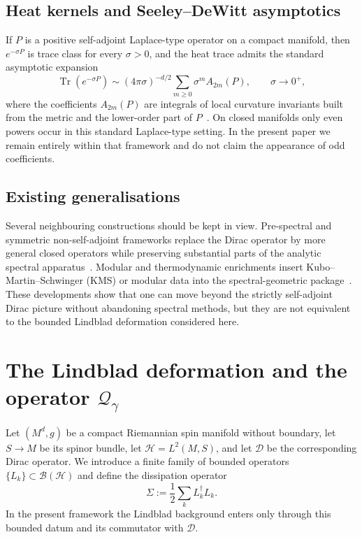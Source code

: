 \documentclass[11pt,a4paper]{article}
\numberwithin{equation}{section}
\theoremstyle{definition}
\newcommand{\cH}{\mathcal{H}}
\newcommand{\cD}{\mathcal{D}}
\newcommand{\Sig}{\Sigma}
\newcommand{\Tr}{\operatorname{Tr}}
\begin{document}
\subsection{Heat kernels and Seeley--DeWitt asymptotics}

If $P$ is a positive self-adjoint Laplace-type operator on a compact
manifold, then $e^{-\sigma P}$ is trace class for every $\sigma>0$, and
the heat trace admits the standard asymptotic expansion
\begin{equation}
\Tr(e^{-\sigma P})\sim (4\pi\sigma)^{-d/2}\sum_{m\ge 0}\sigma^m A_{2m}(P),
\qquad \sigma\to 0^+,
\end{equation}
where the coefficients $A_{2m}(P)$ are integrals of local curvature
invariants built from the metric and the lower-order part of
$P$~\cite{Vassilevich2003,Gilkey1995,BerlineGetzlerVergne1992}. On
closed manifolds only even powers occur in this standard Laplace-type
setting. In the present paper we remain entirely within that framework
and do not claim the appearance of odd coefficients.

\subsection{Existing generalisations}

Several neighbouring constructions should be kept in view. Pre-spectral
and symmetric non-self-adjoint frameworks replace the Dirac operator by
more general closed operators while preserving substantial parts of the
analytic spectral apparatus~\cite{ConnesLevitinaEtAl2019,LiWang2025}.
Modular and thermodynamic enrichments insert Kubo--Martin--Schwinger
(KMS) or modular data into the spectral-geometric
package~\cite{BertozziniContiLewkeeratiyutkul2010}. These developments
show that one can move beyond the strictly self-adjoint Dirac picture
without abandoning spectral methods, but they are not equivalent to the
bounded Lindblad deformation considered here.

\section{The Lindblad deformation and the operator
  $\mathcal{Q}_\gamma$}
\label{sec:deformation}

Let $(M^d,g)$ be a compact Riemannian spin manifold without boundary,
let $S\to M$ be its spinor bundle, let $\cH=L^2(M,S)$, and let $\cD$ be
the corresponding Dirac operator. We introduce a finite family of bounded
operators $\{L_k\}\subset \mathcal{B}(\cH)$ and define the dissipation
operator
\begin{equation}
\Sig:=\frac{1}{2}\sum_k L_k^\dagger L_k.
\end{equation}
In the present framework the Lindblad background enters only through this
bounded datum and its commutator with $\cD$.
\end{document}
